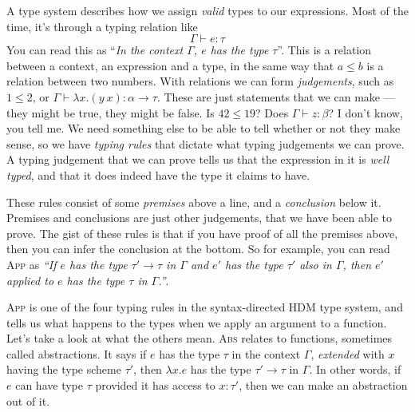 A type system describes how we assign \emph{valid} types to our
expressions. Most of the time, it's through a typing relation like
\[ \Gamma \vdash e : \tau \] You can read this as ``\textit{In the context
  $\Gamma$, $e$ has the type $\tau$}''. This is a relation between a context,
an expression and a type, in the same way that $a \leq b$ is a relation
between two numbers. With relations we can form \textit{judgements},
such as ${1 \leq 2}$, or
${\Gamma \vdash \lambda x . (y \ x) : \alpha \rightarrow \tau}$.  These are just statements that we can
make --- they might be true, they might be false. Is $42 \leq 19$? Does
${\Gamma \vdash z : \beta}$? I don't know, you tell me. We need something else to be
able to tell whether or not they make sense, so we have \emph{typing
  rules} that dictate what typing judgements we can prove.  A typing
judgement that we can prove tells us that the expression in it is
\textit{well typed}, and that it does indeed have the type it
claims to have.
These rules consist of some \emph{premises} above a line, and a
\emph{conclusion} below it. Premises and conclusions are just other
judgements, that we have been able to prove.
The gist of these rules is that if you have proof of all the premises
above, then you can infer the conclusion at the bottom. So for example, you
can read \textsc{App} as \textsl{``If $e$ has the type $\tau' \rightarrow \tau$
  in $\Gamma$ and $e'$ has the type $\tau'$ also in $\Gamma$, then $e'$ applied to
  $e$ has the type $\tau$ in $\Gamma$.''}.

\textsc{App} is one of the four typing rules in the syntax-directed
HDM type system, and tells us what happens to the types when we apply
an argument to a function. Let's take a look at what the others mean.
\textsc{Abs} relates to functions, sometimes called abstractions. It
says if $e$ has the type $\tau$ in the context $\Gamma$, \textit{extended}
with $x$ having the type scheme $\tau'$, then $\lambda x.e$ has the type ${\tau' \rightarrow
\tau}$ in $\Gamma$. In other words, if $e$ can have type $\tau$ provided it has
access to $x : \tau'$, then we can make an abstraction out of it.

